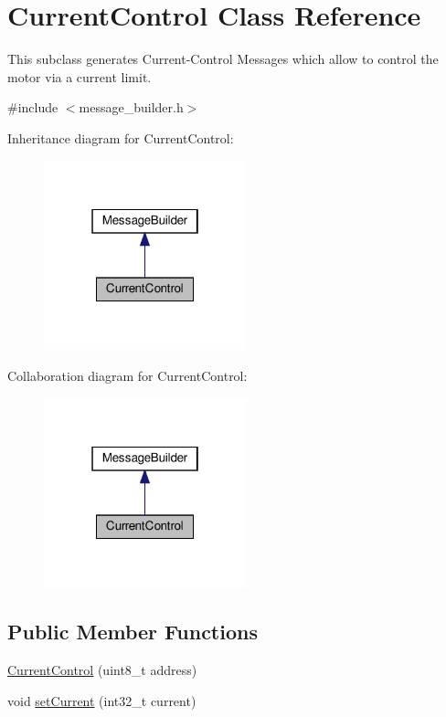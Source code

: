 \hypertarget{classCurrentControl}{}\section{Current\+Control Class Reference}
\label{classCurrentControl}


This subclass generates Current-\/\+Control Messages which allow to control the motor via a current limit.  




{\ttfamily \#include $<$message\+\_\+builder.\+h$>$}



Inheritance diagram for Current\+Control\+:\nopagebreak
\begin{figure}[H]
\begin{center}
\leavevmode
\includegraphics[width=166pt]{classCurrentControl__inherit__graph}
\end{center}
\end{figure}


Collaboration diagram for Current\+Control\+:\nopagebreak
\begin{figure}[H]
\begin{center}
\leavevmode
\includegraphics[width=166pt]{classCurrentControl__coll__graph}
\end{center}
\end{figure}
\subsection*{Public Member Functions}
\begin{DoxyCompactItemize}
\item 
\hyperlink{classCurrentControl_a3e56845d95613d4c55d7b8dde7cc8300}{Current\+Control} (uint8\+\_\+t address)
\item 
void \hyperlink{classCurrentControl_a5096783dd03da0895cd352fc9977736d}{set\+Current} (int32\+\_\+t current)
\end{DoxyCompactItemize}
